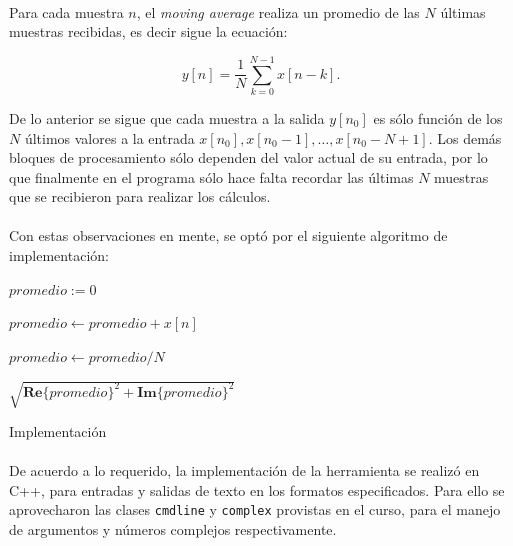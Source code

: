 \documentclass[11pt, spanish]{report}
\begin{document}
\paragraph{} Para cada muestra $n$, el \textit{moving average} realiza un promedio de las $N$ últimas muestras recibidas, es decir sigue la ecuación:

$$ y[n] = \frac1N \sum_{k = 0}^{N-1} x[n-k]. $$

De lo anterior se sigue que cada muestra a la salida $y[n_0]$ es sólo función de los $N$ últimos valores a la entrada $x[n_0], x[n_0 - 1], \dots,  x[n_0 - N + 1]$. Los demás bloques de procesamiento sólo dependen del valor actual de su entrada, por lo que finalmente en el programa sólo hace falta recordar las últimas $N$ muestras que se recibieron para realizar los cálculos. 

\paragraph{} Con estas observaciones en mente, se optó por el siguiente algoritmo de implementación:

\begin{algorithmic}[H] %


	
	\State $promedio := 0$
	

		\State $promedio \gets promedio + x[n]$
	\EndFor
	
	\State $promedio \gets promedio / N$

\Return $\sqrt{\mathbf{Re}\{promedio\}^2 + \mathbf{Im}\{promedio\}^2}$ 
		
\EndWhile

\end{algorithmic}

\newpage

{\huge Implementación}

\paragraph{} De acuerdo a lo requerido, la implementación de la herramienta se realizó en C++, para entradas y salidas de texto en los formatos especificados. Para ello se aprovecharon las clases \texttt{cmdline} y \texttt{complex} provistas en el curso, para el manejo de argumentos y números complejos respectivamente.
\end{document}
